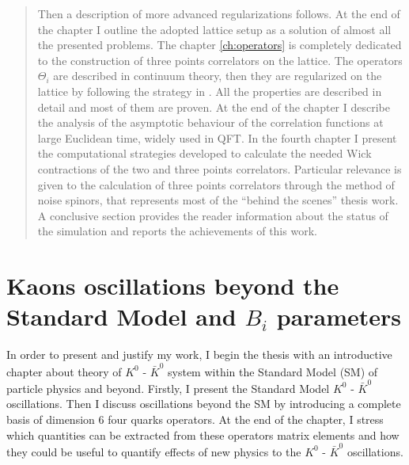 \documentclass[english, LaM, oneside, noexaminfo]{sapthesis}
\newcommand{\kkb}{$K^0$ - $\bar K^0$ }
\begin{document}
\begin{abstract}
    Then a description of more advanced regularizations follows.
    At the end of the chapter I outline the adopted lattice setup as a solution of almost all the presented problems.
    The chapter \ref{ch:operators} is completely dedicated to the construction of three points correlators on the lattice.
    The operators $\Theta_i$ are described in continuum theory, then they are regularized on the lattice by following the strategy in \cite{FR2}.
    All the properties are described in detail and most of them are proven. At the end of the chapter I describe the analysis of the asymptotic behaviour of the correlation functions at large Euclidean time, widely used in QFT.
    In the fourth chapter I present the computational strategies developed to calculate the needed Wick contractions of the two and three points correlators.
    Particular relevance is given to the calculation of three points correlators through the method of noise spinors, that represents most of the ``behind the scenes'' thesis work.
    A conclusive section provides the reader information about the status of the simulation and reports the achievements of this work.
\end{abstract}

\tableofcontents

\mainmatter

\chapter{Kaons oscillations beyond the Standard Model and $B_i$ parameters}\label{chap:kaons}
\lettrine[lines=2, findent=3pt, nindent=0pt]{I}{}n order to present and justify my work, I begin the thesis with an introductive chapter about theory of \kkb system within the Standard Model (SM) of particle physics and beyond. 
Firstly, I present the Standard Model \kkb oscillations.
Then I discuss oscillations beyond the SM by introducing a complete basis of dimension 6 four quarks operators.
At the end of the chapter, I stress which quantities can be extracted from these operators matrix elements and how they could be useful to quantify effects of new physics to the \kkb oscillations.
\end{document}
